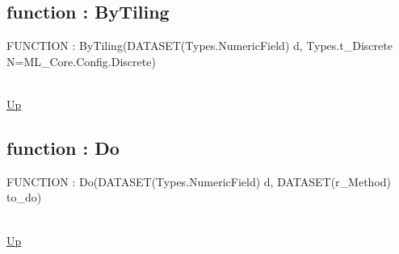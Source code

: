 \subsection*{function : ByTiling}
\hypertarget{ecldoc:ml_core.discretize.bytiling}{FUNCTION : ByTiling(DATASET(Types.NumericField) d, Types.t\_Discrete N=ML\_Core.Config.Discrete)} \\
\hyperlink{ecldoc:ML_Core.Discretize}{Up} \\
\par
\subsection*{function : Do}
\hypertarget{ecldoc:ml_core.discretize.do}{FUNCTION : Do(DATASET(Types.NumericField) d, DATASET(r\_Method) to\_do)} \\
\hyperlink{ecldoc:ML_Core.Discretize}{Up} \\
\par

